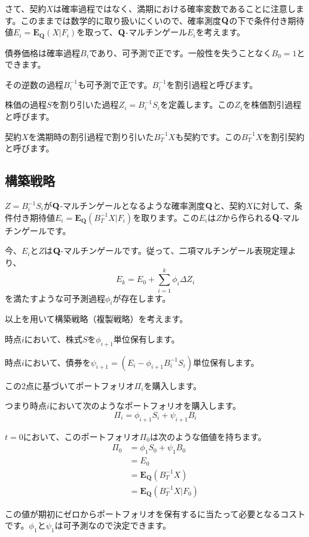 \documentclass[uplatex,a4j,12pt,dvipdfmx]{jsarticle}
\begin{document}
さて、契約$X$は確率過程ではなく、満期における確率変数であることに注意します。このままでは数学的に取り扱いにくいので、確率測度${\bf Q}$の下で条件付き期待値$E_{i} = \mathbf{E_{Q}}( X | F_{i} )$を取って、${\bf Q}$-マルチンゲール$E_{i}$を考えます。

債券価格は確率過程$B_{i}$であり、可予測で正です。一般性を失うことなく$B_{0} = 1$とできます。

その逆数の過程$B_{i}^{-1}$も可予測で正です。$B_{i}^{-1}$を割引過程と呼びます。

株価の過程$S$を割り引いた過程$Z_{i} = B_{i}^{-1} S_{i}$を定義します。この$Z_{i}$を株価割引過程と呼びます。

契約$X$を満期時の割引過程で割り引いた$B_{T}^{-1} X$も契約です。この$B_{T}^{-1} X$を割引契約と呼びます。

\subsection{構築戦略}
$Z = B_{i}^{-1} S_{i}$が${\bf Q}$-マルチンゲールとなるような確率測度${\bf Q}$と、契約$X$に対して、条件付き期待値$E_{i} = \mathbf{E_{Q}}( B_{T}^{-1} X | F_{i} )$を取ります。この$E_{i}$は$Z$から作られる${\bf Q}$-マルチンゲールです。

今、$E_{i}$と$Z$は${\bf Q}$-マルチンゲールです。従って、二項マルチンゲール表現定理より、\[E_{k} = E_{0} + \sum^{k}_{i=1} \phi_{i} \Delta Z_{i}\]を満たすような可予測過程$\phi_{i}$が存在します。

以上を用いて構築戦略（複製戦略）を考えます。

時点$i$において、株式$S$を$\phi_{i+1}$単位保有します。

時点$i$において、債券を$\psi_{i+1} = ( E_{i} - \phi_{i+1} B_{i}^{-1} S_{i} )$単位保有します。

この2点に基づいてポートフォリオ$\Pi_{i}$を購入します。

つまり時点$i$において次のようなポートフォリオを購入します。\[\Pi_{i} = \phi_{i+1} S_{i} + \psi_{i+1} B_{i}\]

$t=0$において、このポートフォリオ$\Pi_{0}$は次のような価値を持ちます。\[\begin{split} \Pi_{0} &= \phi_{1} S_{0} + \psi_{1} B_{0} \\ &= E_{0} \\ &= \mathbf{E_{Q}}(B_{T}^{-1} X) \\ &= \mathbf{E_{Q}}(B_{T}^{-1} X | F_{0}) \end{split}\]

この値が期初にゼロからポートフォリオを保有するに当たって必要となるコストです。$\phi_{1}$と$\psi_{1}$は可予測なので決定できます。
\end{document}
